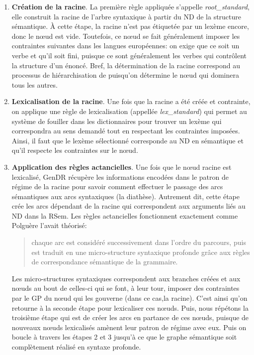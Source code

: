 \begin{enumerate}
  \item \textbf{Création de la racine}.
  La première règle appliquée s'appelle \emph{root\_standard}, elle construit la racine de l'arbre syntaxique à partir du \ac{ND} de la structure sémantique. À cette étape, la racine n'est pas étiquetée par un lexème encore, donc le n\oe{}ud est vide. Toutefois, ce n\oe{}ud se fait généralement imposer les contraintes suivantes dans les langues européennes: on exige que ce soit un verbe et qu'il soit fini, puisque ce sont généralement les verbes qui contrôlent la structure d'un énoncé. Bref, la détermination de la racine correspond au processus de hiérarchisation de \cite{PolguereStructurationmisejeu1990} puisqu'on détermine le n\oe{}ud qui dominera tous les autres.

  \item \textbf{Lexicalisation de la racine}.
  Une fois que la racine a été créée et contrainte, on applique une règle de lexicalisation (appellée \emph{lex\_standard}) qui permet au système de fouiller dans les dictionnaires pour trouver un lexème qui correspondra au sens demandé tout en respectant les contraintes imposées. Ainsi, il faut que le lexème sélectionné corresponde au \ac{ND} en sémantique et qu'il respecte les contraintes sur le n\oe{}ud.

  \item \textbf{Application des règles actancielles}.
  Une fois que le n\oe{}ud racine est lexicalisé, GenDR récupère les informations encodées dans le patron de régime de la racine pour savoir comment effectuer le passage des arcs sémantiques aux arcs syntaxiques (la diathèse). Autrement dit, cette étape crée les arcs dépendant de la racine qui correspondent aux arguments liés au \ac{ND} dans la \ac{RSem}. Les règles actancielles fonctionnent exactement comme Polguère l'avait théorisé:
\begin{quote}
chaque arc est considéré successivement dans l'ordre du parcours, puis est traduit en une micro-structure syntaxique profonde grâce aux règles de correspondance sémantique de la grammaire.
\end{quote}
\vspace{-\baselineskip}
\hfill
\cite[p.~273]{PolguereStructurationmisejeu1990}

Les micro-structures syntaxiques correspondent aux branches créées et aux n\oe{}uds  au bout de celles-ci qui se font, à leur tour, imposer des contraintes par le \ac{GP} du n\oe{}ud qui les gouverne (dans ce cas,la racine). C'est ainsi qu'on retourne à la seconde étape pour lexicaliser ces n\oe{}uds. Puis, nous répétons la troisième étape qui est de créer les arcs en partance de ces n\oe{}uds, puisque de nouveaux n\oe{}uds lexicalisés amènent leur patron de régime avec eux. Puis on boucle à travers les étapes 2 et 3 jusqu'à ce que le graphe sémantique soit complètement réalisé en syntaxe profonde.
\end{enumerate} 

